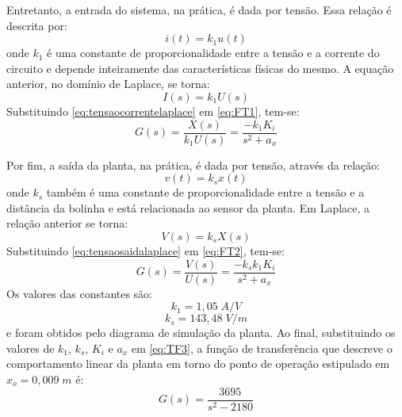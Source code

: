 \documentclass{ifacconf}
\begin{document}
Entretanto, a entrada do sistema, na prática, é dada por tensão. Essa relação é descrita por:
\begin{equation}
    i(t) = k_1u(t)
\end{equation}
\noindent onde $k_1$ é uma constante de proporcionalidade entre a tensão e a corrente do circuito e depende inteiramente das características físicas do mesmo. A equação anterior, no domínio de Laplace, se torna:
\begin{equation}
    I(s) = k_1U(s)
    \label{eq:tensaocorrentelaplace}
\end{equation}
Substituindo \ref{eq:tensaocorrentelaplace} em \ref{eq:FT1}, tem-se:
\begin{equation}
    G(s) = \frac{X(s)}{k_1U(s)} = \frac{-k_1K_i}{s^2+a_x}
    \label{eq:FT2}
\end{equation}

Por fim, a saída da planta, na prática, é dada por tensão, através da relação:
\begin{equation}
    v(t) = k_sx(t)
\end{equation}
onde $k_s$ também é uma constante de proporcionalidade entre a tensão e a distância da bolinha e está
relacionada ao sensor da planta. Em Laplace, a relação anterior se torna:
\begin{equation}
    V(s) = k_sX(s)
    \label{eq:tensaosaidalaplace}
\end{equation}
Substituindo \ref{eq:tensaosaidalaplace} em \ref{eq:FT2}, tem-se:
\begin{equation}
    G(s) = \frac{V(s)}{U(s)} = \frac{-k_sk_1K_i}{s^2+a_x}
    \label{eq:TF3}
\end{equation}
Os valores das constantes são:
\begin{equation}
    k_1 = 1,05\; A/V
\end{equation}
\begin{equation}
    k_s = 143,48\; V/m
\end{equation}
\noindent e foram obtidos pelo diagrama de simulação da planta.
Ao final, substituindo os valores de $k_1$, $k_s$, $K_i$ e $a_x$ em \ref{eq:TF3}, a função de transferência que descreve o comportamento linear da planta em torno do ponto de operação estipulado em $x_o = 0,009\;m$ é:
\begin{equation}
    G(s) = \frac{3695}{s^2 - 2180}
    \label{eq:FTFINAL}
\end{equation}
\end{document}
